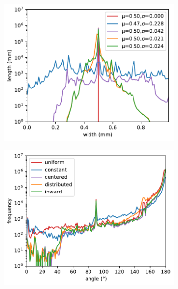 \begin{figure}
\begin{subfigure}{\figwidth}\centering
\includegraphics[height=\figheight]{sources-validation-widths.pdf}
\caption{}
\label{widthHistogram}
\end{subfigure}
\begin{subfigure}{\figwidth}\centering
\includegraphics[height=\figheight]{sources-validation-angles.pdf}
\caption{}
\label{smoothness}
\end{subfigure}

\end{figure}
